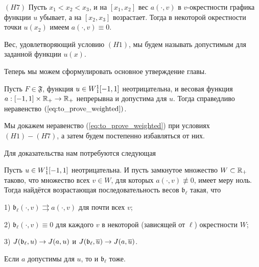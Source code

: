 \bigskip
\noindent
$(H7)$ Пусть $x_1 < x_2 < x_3$,
и на $[x_1, x_2]$ вес $a(\cdot, v)$ в $v$-окрестности графика функции $u$ убывает,
а на $[x_2, x_3]$ возрастает.
Тогда в некоторой окрестности точки $u(x_2)$ имеем $a(\cdot, v) \equiv 0$.

\bigskip

Вес, удовлетворяющий условию $(H1)$, мы будем называть допустимым для заданной функции $u(x)$.

\medskip

Теперь мы можем сформулировать основное утверждение главы.
\begin{thm}
\label{thm:unbounded_growth}
Пусть $F \in \mathfrak{F}$, функция $u \in W{}_1^1[-1, 1]$ неотрицательна,
и весовая функция $a: [-1, 1] \times \mathbb R_+ \to \mathbb R_+$ непрерывна
и допустима для $u$.
Тогда справедливо неравенство $(\ref{eq:to_prove_weighted})$.
\end{thm}

Мы докажем неравенство (\ref{eq:to_prove_weighted}) при условиях $(H1)-(H7)$,
а затем будем постепенно избавляться от них.

Для доказательства нам потребуются следующая
\begin{lm}
\label{lm:approx_with_zero_stripe}
Пусть $u \in W{}_1^1[-1, 1]$ неотрицательна.
И пусть замкнутое множество $W \subset \mathbb R_+$ таково, что множество всех $v \in W$, для которых $a(\cdot, v) \not\equiv 0$, имеет меру ноль.
Тогда найдётся возрастающая последовательность весов $\mathfrak b_{\ell}$ такая, что

1) $\mathfrak b_{\ell}(\cdot, v) \rightrightarrows a(\cdot, v)$ для почти всех $v$;

2) $\mathfrak b_{\ell}(\cdot, v) \equiv 0$ для каждого $v$ в некоторой (зависящей от $\ell$) окрестности $W$;

3) $J(\mathfrak b_{\ell}, u) \to J(a, u)$ и $\IWg(\mathfrak b_{\ell}, \mon{u}) \to \IWg(a, \mon{u})$.
\end{lm}

\begin{rem}
Если $a$ допустимы для $u$, то и $\mathfrak b_{\ell}$ тоже.
\end{rem}

